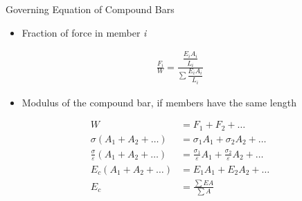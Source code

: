 \documentclass[10pt, svgnames]{beamer}
\begin{document}
\begin{frame}[label={sec:org0f9f398}]{Governing Equation of Compound Bars}
\begin{itemize}
\item Fraction of force in member \emph{i}
\end{itemize}

\begin{align*}
  \frac{F_i}{W} = \frac{\dfrac{E_i A_i}{L_i}}{\displaystyle\sum \dfrac{E_i A_i}{L_i}}
\end{align*}

\begin{itemize}
\item Modulus of the compound bar, if members have the same length
\end{itemize}

\begin{align*}
    W &= F_1 + F_2 + \ldots \\
    \sigma \left(A_1 + A_2 + \ldots \right) &= \sigma_1 A_1 + \sigma_2 A_2 + \ldots \\
    \frac{\sigma}{\varepsilon} \left(A_1 + A_2 + \ldots \right) &= \frac{\sigma_1}{\varepsilon}A_1 + \frac{\sigma_2}{\varepsilon}A_2 + \ldots \\
    E_c \left(A_1 + A_2 + \ldots \right) &= E_1 A_1 + E_2 A_2 + \ldots \\
    E_c &= \frac{\sum EA}{\sum A}
\end{align*}
\end{frame}
\end{document}
